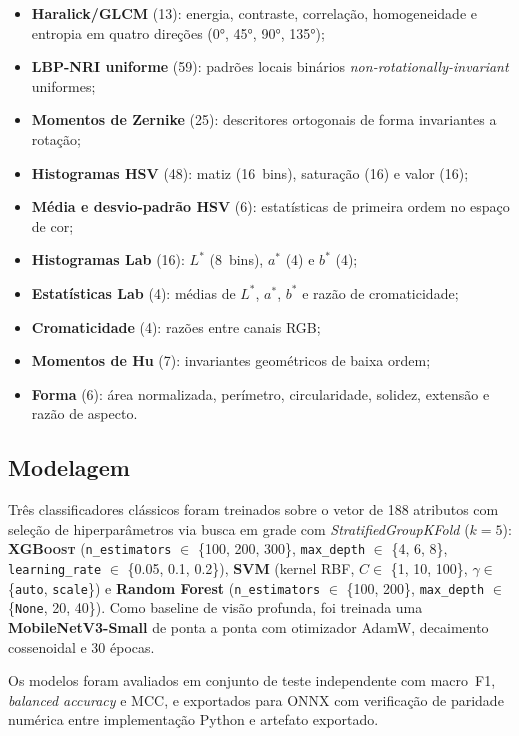 \documentclass[kdmile,a4paper]{kdmile}
\providecommand{\gls}[1]{\textnormal{\textsc{#1}}}
\begin{document}
\begin{itemize}\setlength\itemsep{2pt}
  \item \textbf{Haralick/\gls{GLCM}} (13): energia, contraste, correlação,
    homogeneidade e entropia em quatro direções (0°, 45°, 90°, 135°);
  \item \textbf{LBP-NRI uniforme} (59): padrões locais binários
    \textit{non-rotationally-invariant} uniformes;
  \item \textbf{Momentos de Zernike} (25): descritores ortogonais de forma
    invariantes a rotação;
  \item \textbf{Histogramas \gls{HSV}} (48): matiz (16~bins), saturação (16)
    e valor (16);
  \item \textbf{Média e desvio-padrão \gls{HSV}} (6): estatísticas de
    primeira ordem no espaço de cor;
  \item \textbf{Histogramas Lab} (16): $L^*$ (8~bins), $a^*$ (4) e $b^*$ (4);
  \item \textbf{Estatísticas Lab} (4): médias de $L^*$, $a^*$, $b^*$ e razão
    de cromaticidade;
  \item \textbf{Cromaticidade} (4): razões entre canais RGB;
  \item \textbf{Momentos de Hu} (7): invariantes geométricos de baixa ordem;
  \item \textbf{Forma} (6): área normalizada, perímetro, circularidade,
    solidez, extensão e razão de aspecto.
\end{itemize}

\subsection{Modelagem}

Três classificadores clássicos foram treinados sobre o vetor de 188 atributos
com seleção de hiperparâmetros via busca em grade com
\textit{StratifiedGroupKFold} ($k=5$): \textbf{\gls{XGBoost}}
(\texttt{n\_estimators} $\in$ \{100, 200, 300\}, \texttt{max\_depth} $\in$
\{4, 6, 8\}, \texttt{learning\_rate} $\in$ \{0.05, 0.1, 0.2\}),
\textbf{SVM} (kernel RBF, $C \in$ \{1, 10, 100\},
$\gamma \in$ \{\texttt{auto}, \texttt{scale}\}) e \textbf{Random Forest}
(\texttt{n\_estimators} $\in$ \{100, 200\}, \texttt{max\_depth} $\in$
\{\texttt{None}, 20, 40\}). Como baseline de visão profunda, foi treinada uma
\textbf{MobileNetV3-Small} de ponta a ponta com otimizador AdamW, decaimento
cossenoidal e 30 épocas.

Os modelos foram avaliados em conjunto de teste independente com macro~F1,
\textit{balanced accuracy} e MCC, e exportados para ONNX com verificação de
paridade numérica entre implementação Python e artefato exportado.
\end{document}
